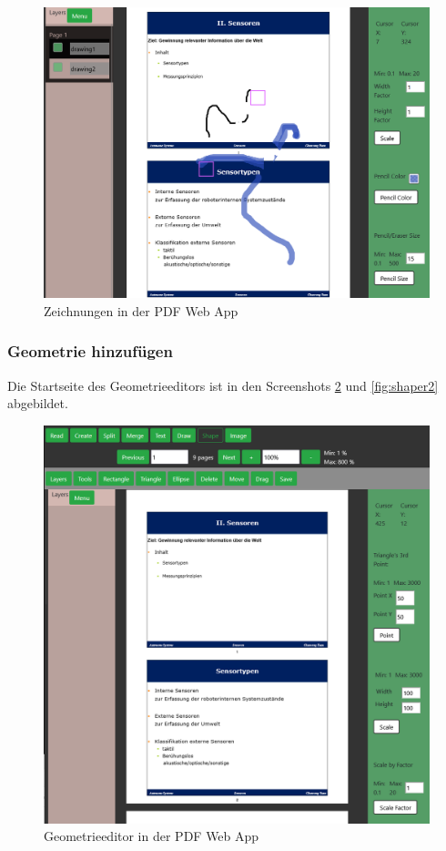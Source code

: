 \begin{figure}[!htbp]
	\centering
	\includegraphics[width=1\textwidth]{"images/drawing.png"}
	\caption{Zeichnungen in der PDF Web App}
	\label{fig:drawing}
\end{figure}


\subsubsection{Geometrie hinzufügen}
Die Startseite des Geometrieeditors ist in den Screenshots \ref{fig:shaper} und \ref{fig:shaper2} abgebildet. 

\begin{figure}[!htbp]
	\centering
	\includegraphics[width=1\textwidth]{"images/shaper.png"}
	\caption{Geometrieeditor in der PDF Web App}
	\label{fig:shaper}
\end{figure}

